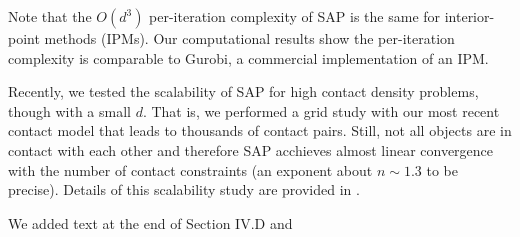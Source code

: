 Note that the $O(d^3)$ per-iteration complexity of SAP is the same
for interior-point methods (IPMs).  Our computational results show the per-iteration
complexity is comparable to Gurobi, a commercial implementation of an IPM.

Recently, we tested the scalability of SAP for high contact density problems,
though with a small $d$. That is, we performed a grid study with our most recent
contact model that leads to thousands of contact pairs. Still, not all objects
are in contact with each other and therefore SAP acchieves almost linear
convergence with the number of contact constraints (an exponent about $n\sim1.3$
to be precise). Details of this scalability study are provided in
\cite{bib:masterjohn2021discrete}.

We added text at the end of Section IV.D and 

